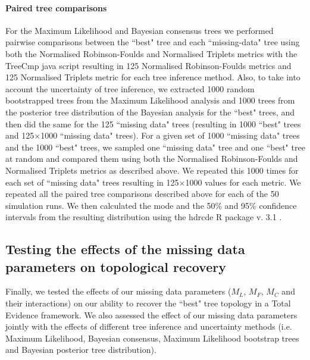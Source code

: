 \documentclass[10pt,letterpaper]{article}
\begin{document}
\paragraph*{Paired tree comparisons}
\label{tree_comparisons}
For the Maximum Likelihood and Bayesian consensus trees we performed pairwise comparisons between the ``best" tree and each ``missing-data" tree using both the Normalised Robinson-Foulds and Normalised Triplets metrics with the TreeCmp java script \cite{Bogdanowicz2012} resulting in 125 Normalised Robinson-Foulds metrics and 125 Normalised Triplets metric for each tree inference method. Also, to take into account the uncertainty of tree inference, we extracted 1000 random bootstrapped trees from the Maximum Likelihood analysis and 1000 trees from the posterior tree distribution of the Bayesian analysis for the ``best" trees, and then did the same for the 125 ``missing data" trees (resulting in 1000 ``best" trees and 125$\times$1000 ``missing data" trees). 
For a given set of 1000 ``missing data" trees and the 1000 ``best" trees, we sampled one ``missing data" tree and one ``best" tree at random and compared them using both the Normalised Robinson-Foulds and Normalised Triplets metrics as described above. We repeated this 1000 times for each set of ``missing data" trees resulting in 125$\times$1000 values for each metric. We repeated all the paired tree comparisons described above for each of the 50 simulation runs. We then calculated the mode and the 50\% and 95\% confidence intervals from the resulting distribution using the hdrcde R package v. 3.1 \cite{hdrcde}.

\subsection*{Testing the effects of the missing data parameters on topological recovery}
Finally, we tested the effects of our missing data parameters ($M_{L}$, $M_{F}$, $M_{C}$ and their interactions) on our ability to recover the ``best" tree topology in a Total Evidence framework. We also assessed the effect of our missing data parameters jointly with the effects of different tree inference and uncertainty methods (i.e. Maximum Likelihood, Bayesian consensus, Maximum Likelihood bootstrap trees and Bayesian posterior tree distribution).
\end{document}
